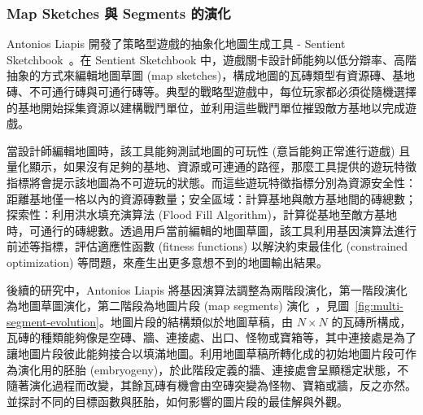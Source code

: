 





\subsubsection{Map Sketches 與 Segments 的演化}
\label{sssec:relatedworks-proceduralgamepatterns-mapsketches}

Antonios Liapis 開發了策略型遊戲的抽象化地圖生成工具 - Sentient Sketchbook~\cite{liapis2013generating}。在 Sentient Sketchbook 中，遊戲關卡設計師能夠以低分辯率、高階抽象的方式來編輯地圖草圖 (map sketches)，構成地圖的瓦磚類型有資源磚、基地磚、不可通行磚與可通行磚等。典型的戰略型遊戲中，每位玩家都必須從隨機選擇的基地開始採集資源以建構戰鬥單位，並利用這些戰鬥單位摧毀敵方基地以完成遊戲。

當設計師編輯地圖時，該工具能夠測試地圖的可玩性 (意旨能夠正常進行遊戲) 且量化顯示，如果沒有足夠的基地、資源或可連通的路徑，那麼工具提供的遊玩特徵指標將會提示該地圖為不可遊玩的狀態。而這些遊玩特徵指標分別為資源安全性：距離基地僅一格以內的資源磚數量；安全區域：計算基地與敵方基地間的磚總數；探索性：利用洪水填充演算法 (Flood Fill Algorithm)，計算從基地至敵方基地時，可通行的磚總數。透過用戶當前編輯的地圖草圖，該工具利用基因演算法進行前述等指標，評估適應性函數 (fitness functions) 以解決約束最佳化 (constrained optimization) 等問題，來產生出更多意想不到的地圖輸出結果。

後續的研究中，Antonios Liapis 將基因演算法調整為兩階段演化，第一階段演化為地圖草圖演化，第二階段為地圖片段 (map segments) 演化~\cite{liapis2017multi}，見圖~\ref{fig:multi-segment-evolution}。地圖片段的結構類似於地圖草稿，由 $N\times N$ 的瓦磚所構成，瓦磚的種類能夠像是空磚、牆、連接處、出口、怪物或寶箱等，其中連接處是為了讓地圖片段彼此能夠接合以填滿地圖。利用地圖草稿所轉化成的初始地圖片段可作為演化用的胚胎 (embryogeny)，於此階段定義的牆、連接處會呈顯穩定狀態，不隨著演化過程而改變，其餘瓦磚有機會由空磚突變為怪物、寶箱或牆，反之亦然。並探討不同的目標函數與胚胎，如何影響的圖片段的最佳解與外觀。

